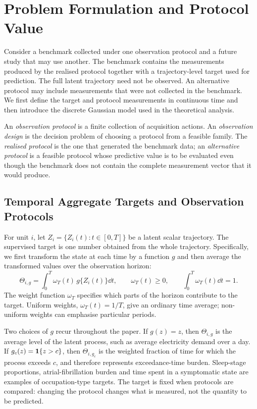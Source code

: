 \section{Problem Formulation and Protocol Value}
\label{sec:formulation}
Consider a benchmark collected under one observation protocol and a future study
that may use another. The benchmark contains the measurements produced by the
realised protocol together with a trajectory-level target used for prediction.
The full latent trajectory need not be observed. An alternative protocol may
include measurements that were not collected in the benchmark. We first define
the target and protocol measurements in continuous time and then introduce the
discrete Gaussian model used in the theoretical analysis.

An \textit{observation protocol} is a finite collection of acquisition actions. An \textit{observation design} is the decision problem of choosing a protocol from a feasible family. The \textit{realised protocol} is the one that generated the benchmark data; an \textit{alternative protocol} is a feasible protocol whose predictive value is to be evaluated even though the benchmark does not contain the complete measurement vector that it would produce.

\subsection{Temporal Aggregate Targets and Observation Protocols}
\label{sec:temporal-protocol}

For unit $i$, let $Z_i=\{Z_i(t):t\in[0,T]\}$ be a latent scalar trajectory. The
supervised target is one number obtained from the whole trajectory. Specifically,
we first transform the state at each time by a function $g$ and then average the
transformed values over the observation horizon:
\begin{equation}
\Theta_{i,g}=\int_0^T\omega_T(t)\,g\{Z_i(t)\}\dd t,
\qquad \omega_T(t)\ge0,
\qquad \int_0^T\omega_T(t)\dd t=1 .
\label{eq:label-continuous}
\end{equation}
The weight function $\omega_T$ specifies which parts of the horizon contribute
to the target. Uniform weights, $\omega_T(t)=1/T$, give an ordinary time
average; non-uniform weights can emphasise particular periods.

Two choices of $g$ recur throughout the paper. If $g(z)=z$, then
$\Theta_{i,g}$ is the average level of the latent process, such as average
electricity demand over a day. If
$g_c(z)=\mathbf{1}\{z>c\}$, then $\Theta_{i,g_c}$ is the weighted fraction of time for
which the process exceeds $c$, and therefore represents exceedance-time burden.
Sleep-stage proportions, atrial-fibrillation burden and time spent in a
symptomatic state are examples of occupation-type targets.
The target is fixed when protocols are compared: changing the protocol changes
what is measured, not the quantity to be predicted.

